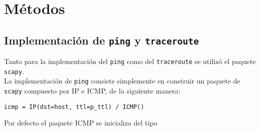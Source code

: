 \section{M\'etodos}
 
 \subsection{Implementaci\'on de \texttt{ping} y \texttt{traceroute}}
 
 Tanto para la implementaci\'on del \texttt{ping} como del \texttt{traceroute} se utiliz\'o el paquete \texttt{scapy}. \\
 
 La implementaci\'on de \texttt{ping} consiste simplemente en construir un paquete de \texttt{scapy} compuesto por IP e ICMP, de la siguiente manera:\\
 
 \begin{center}
    \texttt{icmp = IP(dst=host, ttl=p\_ttl) / ICMP()}
 \end{center}
 
 Por defecto el paquete ICMP se inicializa del tipo 
